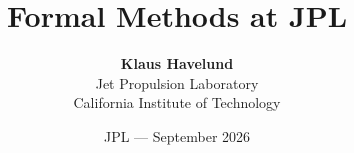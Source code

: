 \documentclass{beamer}
\title{Formal Methods at JPL}
\author{{\bf Klaus Havelund}\\
Jet Propulsion Laboratory\\
California Institute of Technology\\
}
\date[]{JPL --- September 2026}
\begin{document}
\begin{frame}
  \titlepage
\end{frame}

\end{document}
